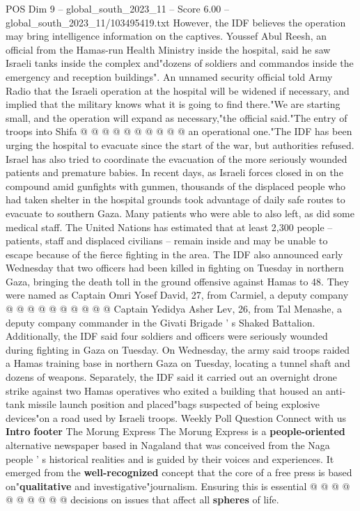\begin{textsample}{POS Dim 9 – global\_south\_2023\_11 – Score 6.00 – global\_south\_2023\_11/103495419.txt}
However, the IDF believes the operation may bring intelligence information on the captives.
Youssef Abul Reesh, an official from the Hamas-run Health Ministry inside the hospital, said he saw Israeli tanks inside the complex and"dozens of soldiers and commandos inside the emergency and reception buildings".
An unnamed security official told Army Radio that the Israeli operation at the hospital will be widened if necessary, and implied that the military knows what it is going to find there."We are starting small, and the operation will expand as necessary,"the official said."The entry of troops into Shifa @ @ @ @ @ @ @ @ @ @ an operational one."The IDF has been urging the hospital to evacuate since the start of the war, but authorities refused.
Israel has also tried to coordinate the evacuation of the more seriously wounded patients and premature babies.
In recent days, as Israeli forces closed in on the compound amid gunfights with gunmen, thousands of the displaced people who had taken shelter in the hospital grounds took advantage of daily safe routes to evacuate to southern Gaza.
Many patients who were able to also left, as did some medical staff.
The United Nations has estimated that at least 2,300 people -- patients, staff and displaced civilians -- remain inside and may be unable to escape because of the fierce fighting in the area.
The IDF also announced early Wednesday that two officers had been killed in fighting on Tuesday in northern Gaza, bringing the death toll in the ground offensive against Hamas to 48.
They were named as Captain Omri Yosef David, 27, from Carmiel, a deputy company @ @ @ @ @ @ @ @ @ @ Captain Yedidya Asher Lev, 26, from Tal Menashe, a deputy company commander in the Givati Brigade ' s Shaked Battalion.
Additionally, the IDF said four soldiers and officers were seriously wounded during fighting in Gaza on Tuesday.
On Wednesday, the army said troops raided a Hamas training base in northern Gaza on Tuesday, locating a tunnel shaft and dozens of weapons.
Separately, the IDF said it carried out an overnight drone strike against two Hamas operatives who exited a building that housed an anti-tank missile launch position and placed"bags suspected of being explosive devices"on a road used by Israeli troops.
Weekly Poll Question Connect with us \textbf{Intro} \textbf{footer} The Morung Express The Morung Express is a \textbf{people-oriented} alternative newspaper based in Nagaland that was conceived from the Naga people ' s historical realities and is guided by their voices and experiences.
It emerged from the \textbf{well-recognized} concept that the core of a free press is based on"\textbf{qualitative} and investigative"journalism.
Ensuring this is essential @ @ @ @ @ @ @ @ @ @ decisions on issues that affect all \textbf{spheres} of life.

\end{textsample}
